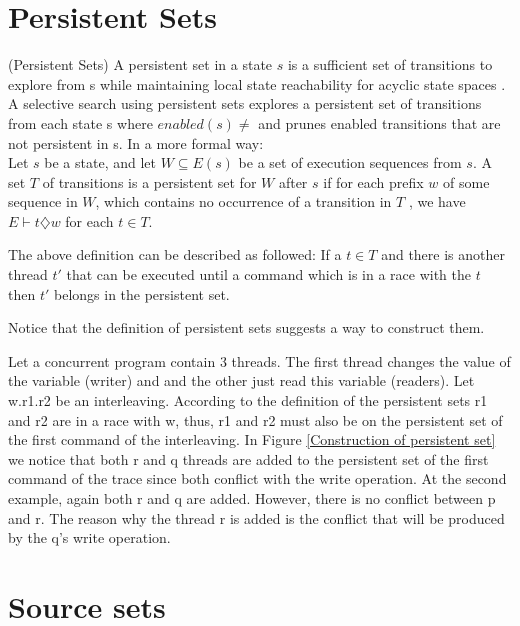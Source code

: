 \section{Persistent Sets}

\begin{definition}{(Persistent Sets)}
A persistent set in a state $s$ is a sufficient set of transitions to
explore from s while maintaining local state reachability for acyclic state spaces \cite{God97}. A selective search using persistent
sets explores a persistent set of transitions from each state s where $enabled(s) \neq $ and prunes enabled transitions that
are not persistent in s.
In a more formal way:\\

Let $s$ be a state, and let $W \subseteq E(s)$ be a set
of execution sequences from $s$. A set $T$ of transitions is a persistent set for $W$
after $s$ if for each prefix $w$ of some sequence in $W$, which contains no occurrence
of a transition in $T$ , we have $E \vdash t \diamondsuit w$ for each $t \in T$.
\end{definition}

The above definition can be described as followed: If a $t \in T$ and there is another thread $t'$ that can be executed until a command which
is in a race with the $t$ then $t'$ belongs in the persistent set.

Notice that the definition of persistent sets suggests a way to construct them.

Let a concurrent program contain 3 threads. The first thread changes the value of the variable (writer) and and the other just read this variable (readers).
Let w.r1.r2 be an interleaving. According to the definition of the persistent sets r1 and r2 are in a race with w, thus, r1 and r2 must also be on the persistent set
of the first command of the interleaving. In Figure \ref{Construction of persistent set} we notice that both r and q threads are added to the persistent set of the first
command of the trace since both conflict with the write operation. At the second example, again both r and q are added. However, there is no conflict between p and r. The reason
why the thread r is added is the conflict that will be produced by the q's write operation.


\section{Source sets}

